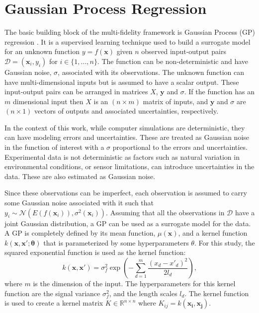 \section{Gaussian Process Regression} \label{sec:gpr}
The basic building block of the multi-fidelity framework is Gaussian Process (GP) regression \cite{rasmussen_gaussian_2006}.
It is a supervised learning technique used to build a surrogate model for an unknown function $y = f(\mathbf{x})$ given $n$ observed input-output pairs $\mathcal{D} = (\mathbf{x}_i, y_i)$ for $i \in\{1,...,n\}$.
The function can be non-deterministic and have Gaussian noise, $\sigma$, associated with its observations.
The unknown function can have multi-dimensional inputs but is assumed to have a scalar output.
These input-output pairs can be arranged in matrices $X$, $\mathbf{y}$ and $\sigma$.
If the function has an $m$ dimensional input then $X$ is an $\left (n \times m \right)$ matrix of inputs, and $\mathbf{y}$ and $\sigma$ are $\left (n \times 1 \right)$ vectors of outputs and associated uncertainties, respectively.

In the context of this work, while computer simulations are deterministic, they can have modeling errors and uncertainties. 
These are treated as Gaussian noise in the function of interest with a $\sigma$ proportional to the errors and uncertainties.
Experimental data is not deterministic as factors such as natural variation in environmental conditions, or sensor limitations, can introduce uncertainties in the data. 
These are also estimated as Gaussian noise.

Since these observations can be imperfect, each observation is assumed to carry some Gaussian noise associated with it such that $y_i \sim \mathcal{N}(E(f(\mathbf{x}_i)),\sigma^2(\mathbf{x}_i))$.
Assuming that all the observations in $\mathcal{D}$ have a joint Gaussian distribution, a GP can be used as a surrogate model for the data.
A GP is completely defined by its mean function, $ \mu(\mathbf{x}) $, and a kernel function $k(\mathbf{x,x';\theta})$ that is parameterized by some hyperparameters $\theta$.
For this study, the squared exponential function is used as the kernel function:
\begin{equation}
    k\left (\mathbf{x,x'} \right ) = \sigma_f^2 \exp \left ( -\sum_{d=1}^{m}\frac{\left ( x_d - x'_d \right )^2}{2l_d} \right ),
\end{equation}
where $m$ is the dimension of the input.
The hyperparameters for this kernel function are the signal variance $\sigma_f^2$, and the length scales $l_d$.
The kernel function is used to create a kernel matrix $K \in \mathbb{R} ^{ n \times n}$ where $K_{ij} = k\mathbf{\left( x_i, x_j \right )}$.


